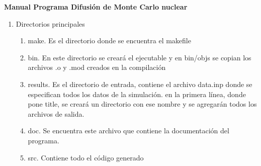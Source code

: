 \documentclass[letterpaper,12pt]{article}
\begin{document}




\begin{center}


   \Huge {\bf{  Manual Programa Difusión de Monte Carlo nuclear\\
   }}
                
\end{center}


               \normalsize
               
               \begin{enumerate}
               \item Directorios principales
               \begin{enumerate}
               \item make. Es el directorio donde se encuentra el makefile
               \item bin. En este directorio se creará el ejecutable y en bin/objs se copian los archivos .o y .mod creados en la compilación
               \item results. Es el directorio de entrada, contiene el archivo data.inp donde se especifican todos los datos de la simulación. en la primera línea, donde pone title, se creará un directorio con ese nombre y se agregarán todos los archivos de salida.
               \item doc. Se encuentra este archivo que contiene la documentación del programa.
               \item src. Contiene todo el código generado
               \end{enumerate}
               

\end{enumerate}
\end{document}
